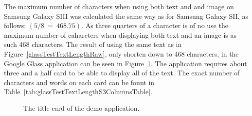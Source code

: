 The maximum number of characters when using both text and and image on Samsung Galaxy SIII was calculated the same way as for Samsung Galaxy SII, as follows: \((5/8~=~468.75)\). As three quarters of a character is of no use the maximum number of caharcters when displaying both text and an image is as such 468 characters. The result of using the same text as in Figure~\ref{glassTestTextLengthRaw}, only shorten down to 468 characters, in the Google Glass application can be seen in Figure~\ref{glassTestTextLengthS3Columns}. The application requires about three and a half card to be able to display all of the text. The exact number of characters and words on each card can be fount in Table~\ref{tab:glassTestTextLengthS3ColumnsTable}.

	\begin{figure}[H]%
		\centering
   		 \qquad
   		 \qquad
   		 \qquad
   		 \qquad
		\caption{The title card of the demo application.}
		\label{glassTestTextLengthS3Columns}
	\end{figure}

